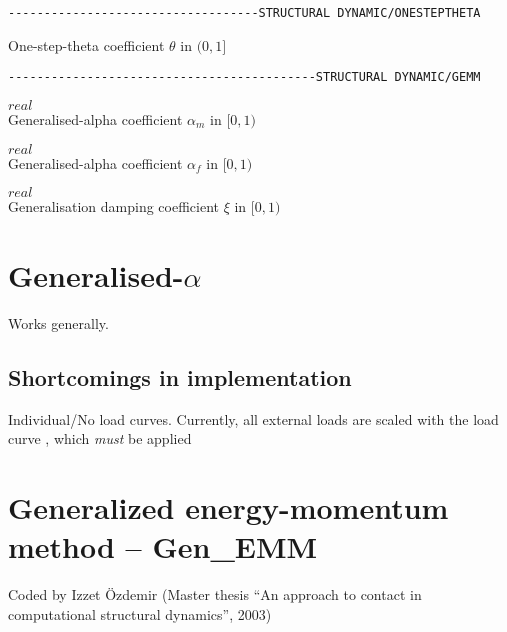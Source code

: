 \begin{verbatim}
-----------------------------------STRUCTURAL DYNAMIC/ONESTEPTHETA
\end{verbatim}

One-step-theta coefficient $\theta$ in $(0,1]$

\begin{verbatim}
-------------------------------------------STRUCTURAL DYNAMIC/GEMM
\end{verbatim}

 $real$\\
Generalised-alpha coefficient $\alpha_m$ in $[0,1)$

 $real$\\
Generalised-alpha coefficient $\alpha_f$ in $[0,1)$

 $real$\\
Generalisation damping coefficient $\xi$ in $[0,1)$

\section{Generalised-$\alpha$}

Works generally.

\subsection{Shortcomings in \ccarat implementation}
Individual/No load curves. Currently, all external loads are scaled with
  the load curve , which \emph{must} be applied


\section{Generalized energy-momentum method -- \ccarat{} Gen\_EMM}
Coded by Izzet \"{O}zdemir (Master thesis ``An approach to contact in
computational structural dynamics'', 2003)

